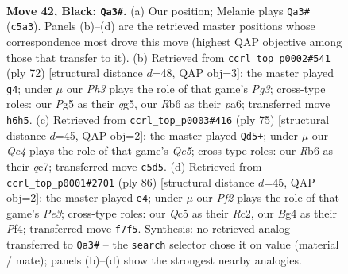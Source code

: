 \documentclass[11pt]{article}
\begin{document}
\clearpage

\begin{figure}[p]\centering
\begin{subfigure}{0.46\textwidth}\centering
\resizebox{\linewidth}{!}{%
\newchessgame
\chessboard[
  setfen={5k2/p4p2/1r5p/2q1p1p1/P5b1/8/8/K7 b - - 5 42},
  showmover=false,
  pgfstyle=straightmove, color=movearrow, markmove={c5-a3}
]}
\caption{}
\end{subfigure}\hfill
\begin{subfigure}{0.46\textwidth}\centering
\resizebox{\linewidth}{!}{%
\newchessgame
\chessboard[
  setfen={k7/1p5p/p7/6q1/3Q4/6P1/PPP5/3K4 w - - 2 37},
  showmover=false,
  pgfstyle=straightmove, color=movearrow, markmove={g3-g4}
]}
\caption{}
\end{subfigure}
\\[4pt]
\begin{subfigure}{0.46\textwidth}\centering
\resizebox{\linewidth}{!}{%
\newchessgame
\chessboard[
  setfen={8/2Q2ppk/1P5p/p7/4q3/8/3K4/8 b - - 3 38},
  showmover=false,
  pgfstyle=straightmove, color=movearrow, markmove={e4-d5}
]}
\caption{}
\end{subfigure}\hfill
\begin{subfigure}{0.46\textwidth}\centering
\resizebox{\linewidth}{!}{%
\newchessgame
\chessboard[
  setfen={8/5p1k/r7/8/5Pp1/4P1P1/2R2K2/8 w - - 0 44},
  showmover=false,
  pgfstyle=straightmove, color=movearrow, markmove={e3-e4}
]}
\caption{}
\end{subfigure}
\caption{\textbf{Move 42, Black: \texttt{Qa3\#}.} (a) Our position; Melanie plays \texttt{Qa3\#} (\texttt{c5a3}). Panels (b)--(d) are the retrieved master positions whose correspondence most drove this move (highest QAP objective among those that transfer to it). (b) Retrieved from \texttt{ccrl\_top\_p0002\#541} (ply 72) [structural distance $d$=48, QAP obj=3]: the master played \texttt{g4}; under $\mu$ our \emph{Ph3} plays the role of that game's \emph{Pg3}; cross-type roles: our \emph{P}g5 as their \emph{q}g5, our \emph{R}b6 as their \emph{p}a6; transferred move \texttt{h6h5}. (c) Retrieved from \texttt{ccrl\_top\_p0003\#416} (ply 75) [structural distance $d$=45, QAP obj=2]: the master played \texttt{Qd5+}; under $\mu$ our \emph{Qc4} plays the role of that game's \emph{Qe5}; cross-type roles: our \emph{R}b6 as their \emph{q}c7; transferred move \texttt{c5d5}. (d) Retrieved from \texttt{ccrl\_top\_p0001\#2701} (ply 86) [structural distance $d$=45, QAP obj=2]: the master played \texttt{e4}; under $\mu$ our \emph{Pf2} plays the role of that game's \emph{Pe3}; cross-type roles: our \emph{Q}c5 as their \emph{R}c2, our \emph{B}g4 as their \emph{P}f4; transferred move \texttt{f7f5}. Synthesis: no retrieved analog transferred to \texttt{Qa3\#} -- the \texttt{search} selector chose it on value (material / mate); panels (b)--(d) show the strongest nearby analogies.}
\label{fig:thought-m83}
\end{figure}
\end{document}
